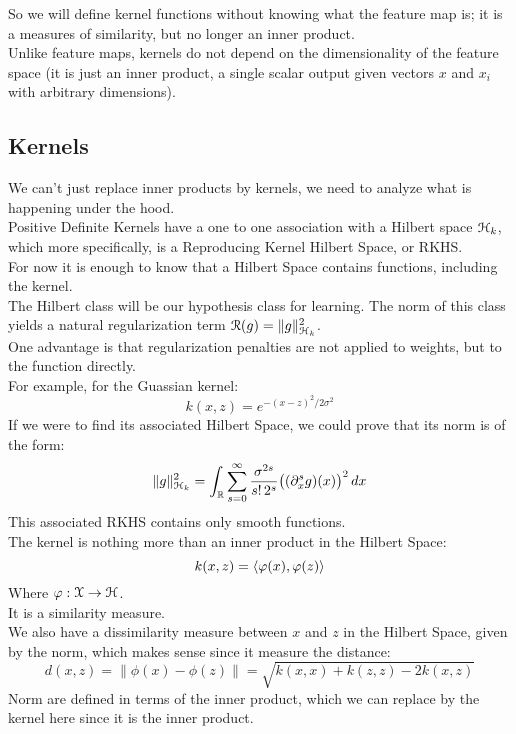 \documentclass[12pt]{article}
\begin{document}
So we will define kernel functions without
knowing what the feature map is; it is a measures
of similarity, but no longer an inner product. \\

Unlike feature maps, kernels do not depend on the
dimensionality of the feature space
(it is just an inner product, a single scalar output
given vectors $x$ and $x_i$ with arbitrary dimensions). \\

\newpage

\subsection*{Kernels}

We can't just replace inner products by kernels,
we need to analyze what is happening under the hood. \\

Positive Definite Kernels have a one to one
association with a Hilbert space 
$\mathcal{H}_k$, which more specifically,
is a Reproducing Kernel Hilbert Space,
or RKHS. \\

For now it is enough to know that a Hilbert Space
contains functions, including the kernel. \\

The Hilbert class will be our hypothesis
class for learning. The norm of this class
yields a natural regularization term
$\mathcal{R}(g) = \|g\|^2_{\mathcal{H}_k}$. \\

One advantage is that regularization penalties
are not applied to weights, but to the function 
directly. \\

For example, for the Guassian kernel:
\[ k(x, z) = e^{-{(x - z)^2/2\sigma^2}} \]
If we were to find its associated Hilbert Space,
we could prove that its norm is of the form:
\[ \|g\|^2_{\mathcal{H}_k} = \int_{\mathbb{R}} \sum_{s=0}^{\infty} 
\frac{\sigma^{2s}}{s! \, 2^s} \big( (\partial_x^s g)(x) 
\big)^2 \, dx\]
This associated RKHS contains only smooth functions. \\

The kernel is nothing more than an inner product
in the Hilbert Space:
\[ k(x, z) = \left\langle \varphi(x), \varphi(z) \right\rangle \]
Where $\varphi: \mathcal{X} \to \mathcal{H}$. \\
It is a similarity measure. \\

We also have a dissimilarity measure between $x$
and $z$ in the Hilbert Space, given by the norm,
which makes sense since it measure the distance:
\[ d(x, z) = \| \phi(x) - \phi(z) \| 
= \sqrt{ k(x, x) + k(z, z) - 2k(x, z) } \]
Norm are defined in terms of the inner product,
which we can replace by the kernel here
since it is the inner product. \\
\end{document}
